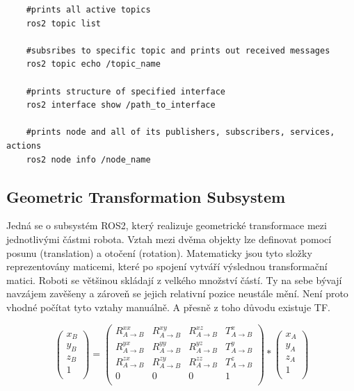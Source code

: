 \begin{verbatim}
	#prints all active topics
	ros2 topic list 
	
	#subsribes to specific topic and prints out received messages
	ros2 topic echo /topic_name
	
	#prints structure of specified interface
	ros2 interface show /path_to_interface
	
	#prints node and all of its publishers, subscribers, services, actions
	ros2 node info /node_name
\end{verbatim}

\subsection*{Geometric Transformation Subsystem}
Jedná se o subsystém ROS2, který realizuje geometrické transformace mezi jednotlivými částmi robota.
Vztah mezi dvěma objekty lze definovat pomocí posunu (translation) a otočení (rotation). Matematicky jsou tyto složky reprezentovány maticemi, které po spojení vytváří výslednou transformační matici. Roboti se většinou skládají z velkého množství částí. Ty na sebe bývají navzájem zavěšeny a zároveň se jejich relativní pozice neustále mění. Není proto vhodné počítat tyto vztahy manuálně. A přesně z toho důvodu existuje TF.

$$
\begin{pmatrix}
	x_B\\
	y_B\\
	z_B\\
	1\\
\end{pmatrix}
=
\begin{pmatrix}
	R_{A\rightarrow B}^{xx} & R_{A\rightarrow B}^{xy} & R_{A\rightarrow B}^{xz} & T_{A\rightarrow B}^x\\
	R_{A\rightarrow B}^{yx} & R_{A\rightarrow B}^{yy} & R_{A\rightarrow B}^{yz} & T_{A\rightarrow B}^y\\
	R_{A\rightarrow B}^{zx} & R_{A\rightarrow B}^{zy} & R_{A\rightarrow B}^{zz} & T_{A\rightarrow B}^z\\
	0 & 0 & 0 & 1\\
\end{pmatrix}
*
\begin{pmatrix}
	x_A\\
	y_A\\
	z_A\\
	1\\
\end{pmatrix}
$$

